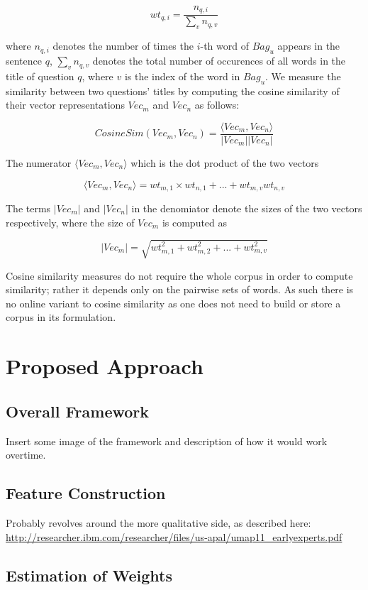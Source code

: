 \documentclass[journal,12pt,onecolumn,draftclsnofoot,]{IEEEtran}
\begin{document}
$$ wt_{q, i} = \frac{n_{q, i}}{\sum_v n_{q, v}} $$

where $n_{q, i}$ denotes the number of times the $i$-th word of $Bag_u$ appears in the sentence $q$, $\sum_v n_{q,v}$ denotes the total number of occurences of all words in the title of question $q$, where $v$ is the index of the word in $Bag_u$. We measure the similarity between two questions' titles by computing the cosine similarity of their vector representations $Vec_m$ and $Vec_n$ as follows:

$$ CosineSim(Vec_m, Vec_n) = \frac{\langle Vec_m,  Vec_n \rangle}{|Vec_m| | Vec_n| }$$

The numerator $\langle Vec_m , Vec_n \rangle$ which is the dot product of the two vectors 

$$ \langle Vec_m , Vec_n \rangle  = wt_{m, 1} \times wt_{n, 1} + ... + wt_{m, v} wt_{n, v} $$

The terms $|Vec_m|$ and $|Vec_n|$ in the denomiator denote the sizes of the two vectors respectively, where the size of $Vec_m$ is computed as 

$$ | Vec_m  | = \sqrt{wt_{m,1}^2 + wt_{m,2}^2 + ... + wt_{m,v}^2} $$

Cosine similarity measures do not require the whole corpus in order to compute similarity; rather it depends only on the pairwise sets of words. As such there is no online variant to cosine similarity as one does not need to build or store a corpus in its formulation.

\section{Proposed Approach}

\subsection{Overall Framework}

Insert some image of the framework and description of how it would work overtime. 

\subsection{Feature Construction}

Probably revolves around the more qualitative side, as described here: 
\url{http://researcher.ibm.com/researcher/files/us-apal/umap11_earlyexperts.pdf}


\subsection{Estimation of Weights}
\end{document}
